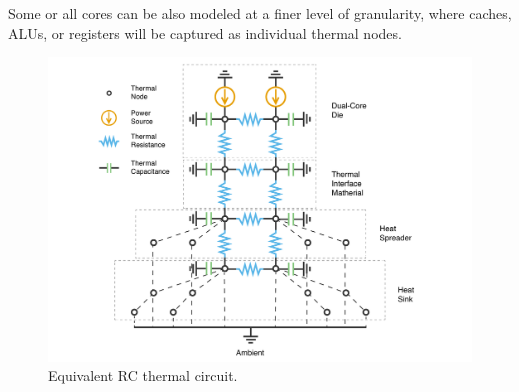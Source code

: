 Some or all cores can be also modeled at a finer level of granularity, where caches, ALUs, or registers will be captured as individual thermal nodes.
\begin{figure}
  \vspace{10pt}
  \centering
  \includegraphics[width=\linewidth]{assets/circuit.pdf}
  \caption{Equivalent RC thermal circuit.}
  \label{fig:circuit}
  \vspace{15pt}
\end{figure}
